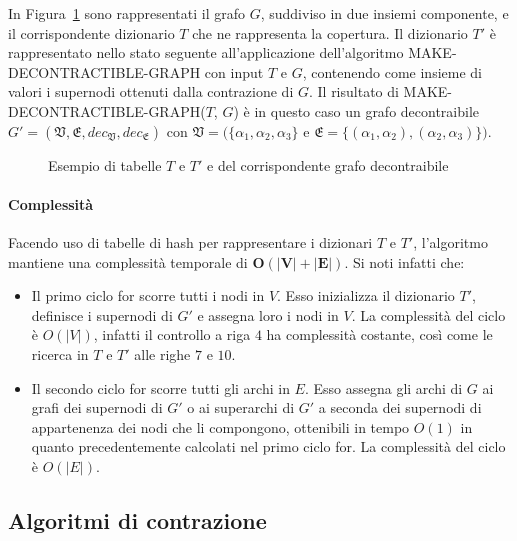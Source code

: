 

In Figura~\ref{fig:make_decontractible_graph_example} sono rappresentati il grafo $G$, suddiviso in due insiemi
componente, e il corrispondente dizionario $T$ che ne rappresenta la copertura. Il dizionario $T\mathcal{'}$ \`e
rappresentato nello stato seguente all'applicazione dell'algoritmo MAKE-DECONTRACTIBLE-GRAPH con input $T$ e $G$,
contenendo come insieme di valori i supernodi ottenuti dalla contrazione di $G$.
Il risultato di MAKE-DECONTRACTIBLE-GRAPH($T$, $G$) \`e in questo caso un grafo decontraibile
$G' = (\mathfrak{V}, \mathfrak{E}, dec_{\mathfrak{V}}, dec_{\mathfrak{E}})$ con
$\mathfrak{V} = (\{\alpha_1, \alpha_2, \alpha_3\}$ e $\mathfrak{E} = \{(\alpha_1, \alpha_2), (\alpha_2, \alpha_3)\})$.

\begin{figure}[H]
    \centering
    
    \vspace{-30pt}
    \caption{Esempio di tabelle $T$ e $T'$ e del corrispondente grafo decontraibile}
    \label{fig:make_decontractible_graph_example}
\end{figure}

\paragraph{Complessità}
Facendo uso di tabelle di hash per rappresentare i dizionari $T$ e $T'$, l'algoritmo mantiene una complessit\`a
temporale di $\mathbf{O(|V| + |E|)}$.
Si noti infatti che:
\begin{itemize}
    \item Il primo ciclo for scorre tutti i nodi in $V$.
    Esso inizializza il dizionario $T'$, definisce i supernodi di $G'$ e assegna loro i nodi in $V$.
    La complessità del ciclo è $O(|V|)$, infatti il controllo a riga $4$ ha complessità costante,
    così come le ricerca in $T$ e $T'$ alle righe $7$ e $10$.
    \item Il secondo ciclo for scorre tutti gli archi in $E$.
    Esso assegna gli archi di $G$ ai grafi dei supernodi di $G'$ o ai superarchi di $G'$ a seconda dei supernodi
    di appartenenza dei nodi che li compongono, ottenibili in tempo $O(1)$ in quanto precedentemente calcolati nel
    primo ciclo for. La complessit\`a del ciclo \`e $O(|E|)$.
\end{itemize}

\subsection{Algoritmi di contrazione}\label{sec:algoritmi-di-contrazione}

